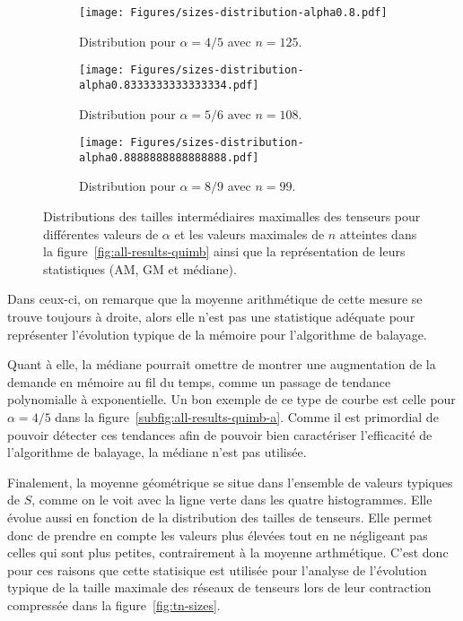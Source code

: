 \begin{figure}[h]
    \centering
    \begin{subfigure}{.49\textwidth}
        \centering
        \texttt{[image: Figures/sizes-distribution-alpha0.8.pdf]}
        \caption{Distribution pour $\alpha = 4/5$ avec $n = 125$.}
        \label{subfig:sizes-distribution-alpha4_5}
    \end{subfigure}
    \hfill
    \begin{subfigure}{.49\textwidth}
        \centering
        \texttt{[image: Figures/sizes-distribution-alpha0.8333333333333334.pdf]}
        \caption{Distribution pour $\alpha = 5/6$ avec $n = 108$.}
        \label{subfig:sizes-distribution-alpha5_6}
    \end{subfigure}
    \medskip
    \vspace{0.1cm}
    \begin{subfigure}{.49\textwidth}
        \centering
        \texttt{[image: Figures/sizes-distribution-alpha0.8888888888888888.pdf]}
        \caption{Distribution pour $\alpha = 8/9$ avec $n = 99$.}
        \label{subfig:sizes-distribution-alpha8_9}
    \end{subfigure}
    \caption[]{Distributions des tailles intermédiaires maximalles des tenseurs pour différentes valeurs de $\alpha$ et les valeurs maximales de $n$ atteintes dans la figure~\ref{fig:all-results-quimb} ainsi que la représentation de leurs statistiques (AM, GM et médiane).}
    \label{fig:sizes-distributions}
\end{figure}
Dans ceux-ci, on remarque que la moyenne arithmétique de cette mesure se trouve toujours à droite, alors elle n'est pas une statistique adéquate pour représenter l'évolution typique de la mémoire pour l'algorithme de balayage.

Quant à elle, la médiane pourrait omettre de montrer une augmentation de la demande en mémoire au fil du temps, comme un passage de tendance polynomialle à exponentielle.
Un bon exemple de ce type de courbe est celle pour $\alpha = 4/5$ dans la figure~\ref{subfig:all-results-quimb-a}.
Comme il est primordial de pouvoir détecter ces tendances afin de pouvoir bien caractériser l'efficacité de l'algorithme de balayage, la médiane n'est pas utilisée.

Finalement, la moyenne géométrique se situe dans l'ensemble de valeurs typiques de $S$, comme on le voit avec la ligne verte dans les quatre histogrammes.
Elle évolue aussi en fonction de la distribution des tailles de tenseurs.
Elle permet donc de prendre en compte les valeurs plus élevées tout en ne négligeant pas celles qui sont plus petites, contrairement à la moyenne arthmétique.
C'est donc pour ces raisons que cette statisique est utilisée pour l'analyse de l'évolution typique de la taille maximale des réseaux de tenseurs lors de leur contraction compressée dans la figure~\ref{fig:tn-sizes}.
